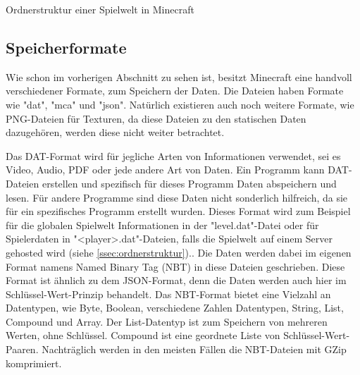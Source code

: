 \begin{listing}[htp]
    \caption{Ordnerstruktur einer Spielwelt in Minecraft\cite{minecraftFolderStruc}}
    \label{lst:ordnerStrukturMinecraft}
\end{listing}



\subsection{Speicherformate}
Wie schon im vorherigen Abschnitt zu sehen ist, besitzt Minecraft eine handvoll verschiedener Formate, zum Speichern der Daten. Die Dateien haben Formate wie "dat", "mca" und "json". Natürlich existieren auch noch weitere Formate, wie PNG-Dateien für Texturen, da diese Dateien zu den statischen Daten dazugehören, werden diese nicht weiter betrachtet.   

Das DAT-Format wird für jegliche Arten von Informationen verwendet, sei es Video, Audio, PDF oder jede andere Art von Daten. Ein Programm kann DAT-Dateien erstellen und spezifisch für dieses Programm Daten abspeichern und lesen. Für andere Programme sind diese Daten nicht sonderlich hilfreich, da sie für ein spezifisches Programm erstellt wurden.\cite{adobeWhatDAT} Dieses Format wird zum Beispiel für die globalen Spielwelt Informationen in der "level.dat"-Datei oder für Spielerdaten in "<player>.dat"-Dateien, falls die Spielwelt auf einem Server gehosted wird (siehe \ref{ssec:ordnerstruktur}).\cite{minecraftPlayerdatFormat}\cite{minecraftFolderStruc}. 
Die Daten werden dabei im eigenen Format namens Named Binary Tag (NBT) in diese Dateien geschrieben. Diese Format ist ähnlich zu dem JSON-Format, denn die Daten werden auch hier im Schlüssel-Wert-Prinzip behandelt. Das NBT-Format bietet eine Vielzahl an Datentypen, wie Byte, Boolean, verschiedene Zahlen Datentypen, String, List, Compound und Array. Der List-Datentyp ist zum Speichern von mehreren Werten, ohne Schlüssel. Compound ist eine geordnete Liste von Schlüssel-Wert-Paaren. Nachträglich werden in den meisten Fällen die NBT-Dateien mit GZip komprimiert.
\cite{minecraftNBT}

